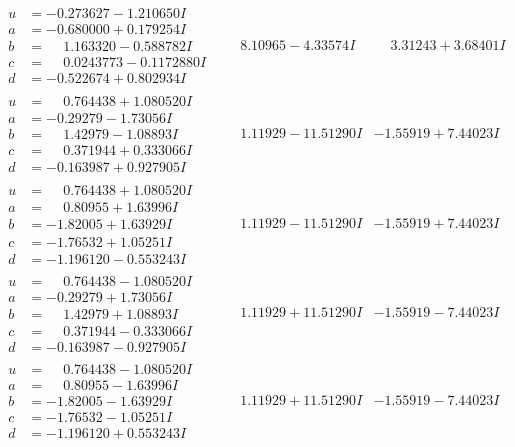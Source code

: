 \documentclass[1p]{elsarticle_modified}
\theoremstyle{definition}
\begin{document}
$$\begin{array}{c|c|c}
\begin{aligned}
u &= -0.273627 - 1.210650 I \\
a &= -0.680000 + 0.179254 I \\
b &= \phantom{-}1.163320 - 0.588782 I \\
c &= \phantom{-}0.0243773 - 0.1172880 I \\
d &= -0.522674 + 0.802934 I\end{aligned}
 & \phantom{-}8.10965 - 4.33574 I & \phantom{-}3.31243 + 3.68401 I \\ \hline\begin{aligned}
u &= \phantom{-}0.764438 + 1.080520 I \\
a &= -0.29279 - 1.73056 I \\
b &= \phantom{-}1.42979 - 1.08893 I \\
c &= \phantom{-}0.371944 + 0.333066 I \\
d &= -0.163987 + 0.927905 I\end{aligned}
 & \phantom{-}1.11929 - 11.51290 I & -1.55919 + 7.44023 I \\ \hline\begin{aligned}
u &= \phantom{-}0.764438 + 1.080520 I \\
a &= \phantom{-}0.80955 + 1.63996 I \\
b &= -1.82005 + 1.63929 I \\
c &= -1.76532 + 1.05251 I \\
d &= -1.196120 - 0.553243 I\end{aligned}
 & \phantom{-}1.11929 - 11.51290 I & -1.55919 + 7.44023 I \\ \hline\begin{aligned}
u &= \phantom{-}0.764438 - 1.080520 I \\
a &= -0.29279 + 1.73056 I \\
b &= \phantom{-}1.42979 + 1.08893 I \\
c &= \phantom{-}0.371944 - 0.333066 I \\
d &= -0.163987 - 0.927905 I\end{aligned}
 & \phantom{-}1.11929 + 11.51290 I & -1.55919 - 7.44023 I \\ \hline\begin{aligned}
u &= \phantom{-}0.764438 - 1.080520 I \\
a &= \phantom{-}0.80955 - 1.63996 I \\
b &= -1.82005 - 1.63929 I \\
c &= -1.76532 - 1.05251 I \\
d &= -1.196120 + 0.553243 I\end{aligned}
 & \phantom{-}1.11929 + 11.51290 I & -1.55919 - 7.44023 I\\

\end{array}$$
\end{document}
